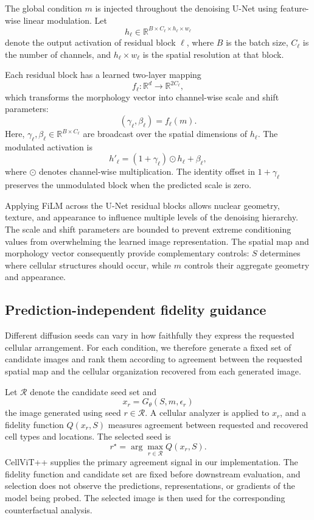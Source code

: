 The global condition $m$ is injected throughout the denoising U-Net using feature-wise linear modulation. Let
\[
h_\ell
\in
\mathbb{R}^{B\times C_\ell\times h_\ell\times w_\ell}
\]
denote the output activation of residual block $\ell$, where $B$ is the batch size, $C_\ell$ is the number of channels, and $h_\ell\times w_\ell$ is the spatial resolution at that block.

Each residual block has a learned two-layer mapping
\[
f_\ell:\mathbb{R}^{d}\rightarrow\mathbb{R}^{2C_\ell},
\]
which transforms the morphology vector into channel-wise scale and shift parameters:
\begin{equation}
(\gamma_\ell,\beta_\ell)=f_\ell(m).
\label{eq:film-parameters}
\end{equation}
Here,
$\gamma_\ell,\beta_\ell\in\mathbb{R}^{B\times C_\ell}$ are broadcast over the spatial dimensions of $h_\ell$. The modulated activation is
\begin{equation}
h'_\ell
=
(1+\gamma_\ell)\odot h_\ell+\beta_\ell,
\label{eq:film}
\end{equation}
where $\odot$ denotes channel-wise multiplication. The identity offset in $1+\gamma_\ell$ preserves the unmodulated block when the predicted scale is zero.

Applying FiLM across the U-Net residual blocks allows nuclear geometry, texture, and appearance to influence multiple levels of the denoising hierarchy. The scale and shift parameters are bounded to prevent extreme conditioning values from overwhelming the learned image representation. The spatial map and morphology vector consequently provide complementary controls: $S$ determines where cellular structures should occur, while $m$ controls their aggregate geometry and appearance.

\subsection{Prediction-independent fidelity guidance}
\label{sec:fidelity-guidance}

Different diffusion seeds can vary in how faithfully they express the requested cellular arrangement. For each condition, we therefore generate a fixed set of candidate images and rank them according to agreement between the requested spatial map and the cellular organization recovered from each generated image.

Let $\mathcal{R}$ denote the candidate seed set and
\[
x_r=G_\theta(S,m,\epsilon_r)
\]
the image generated using seed $r\in\mathcal{R}$. A cellular analyzer is applied to $x_r$, and a fidelity function $Q(x_r,S)$ measures agreement between requested and recovered cell types and locations. The selected seed is
\begin{equation}
r^\star
=
\arg\max_{r\in\mathcal{R}}
Q(x_r,S).
\label{eq:candidate-selection}
\end{equation}
CellViT++ supplies the primary agreement signal in our implementation. The fidelity function and candidate set are fixed before downstream evaluation, and selection does not observe the predictions, representations, or gradients of the model being probed. The selected image is then used for the corresponding counterfactual analysis.

